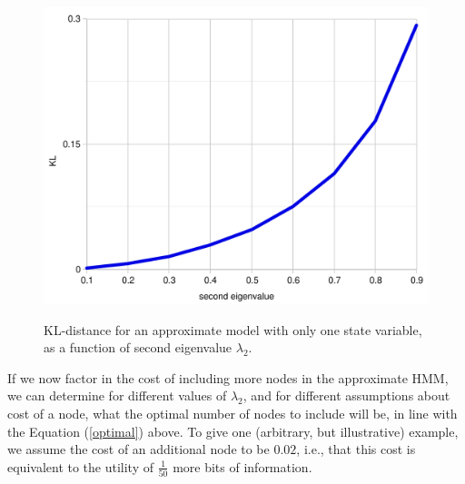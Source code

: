 \documentclass[10pt,letterpaper]{article}
\begin{document}
 \begin{figure}[h]  \begin{center}
 \label{kl-eigen}
\includegraphics[scale=0.33]{kl-eigenvalue-5.pdf} \caption{KL-distance for an approximate model with only one state variable, as a function of second eigenvalue $\lambda_2$.} \end{center} 
\end{figure}

If we now factor in the cost of including more nodes in the approximate HMM, we can determine for different values of $\lambda_2$, and for different assumptions about cost of a node, what the optimal number of nodes to include will be, in line with the Equation (\ref{optimal}) above. To give one (arbitrary, but illustrative) example, we assume the cost of an additional node to be $0.02$, i.e., that this cost is equivalent to the utility of $\frac{1}{50}$ more bits of information.%
\end{document}
